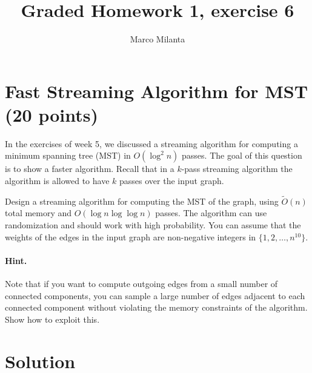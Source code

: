 \documentclass[11pt]{article}
\begin{document}
\author{Marco Milanta}
\title{Graded Homework 1, exercise 6}
\maketitle


\section*{Fast Streaming Algorithm for MST (20 points)}

In the exercises of week 5, we discussed a streaming algorithm for computing a minimum spanning tree (MST) in $O(\log^2{n})$ passes. The goal of this question is to show a faster algorithm. Recall that in a $k$-pass streaming algorithm the algorithm is allowed to have $k$ passes over the input graph. 

Design a streaming algorithm for computing the MST of the graph, using $\tilde{O}(n)$ total memory and $O(\log{n} \log{\log{n}})$ passes. The algorithm can use randomization and should work with high probability. You can assume that the weights of the edges in the input graph are non-negative integers in $\{1, 2, \dots, n^{10}\}$.

\paragraph{Hint.} Note that if you want to compute outgoing edges from a small number of connected components, you can sample a large number of edges adjacent to each connected component without violating the memory constraints of the algorithm. Show how to exploit this.

\section*{Solution}
\end{document}
